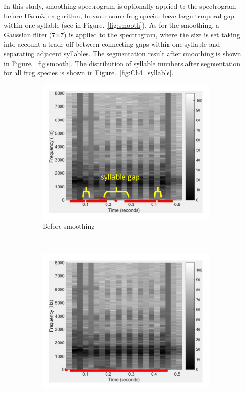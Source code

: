 In this study, smoothing spectrogram is optionally applied to the spectrogram before H$\ddot{a}$rm$\ddot{a}$'s algorithm, because some frog species have large temporal gap within one syllable (see in Figure.~\ref{fig:smooth}). As for the smoothing, a Gaussian filter (7$\times$7) is applied to the spectrogram, where the size is set taking into account a trade-off between connecting gaps within one syllable and separating adjacent syllables. The segmentation result after smoothing is shown in Figure.~\ref{fig:smooth}. The distribution of syllable numbers after segmentation for all frog species is shown in Figure.~\ref{fig:Ch4_syllable}.

\begin{figure}[htb!]
\centering
        \begin{subfigure}[b]{0.6\linewidth}
                \includegraphics[width=\textwidth]{image/Ch4/no.pdf}
                \caption{Before smoothing}
        \end{subfigure}%
        \\ 
        \begin{subfigure}[b]{0.6\linewidth}
                \includegraphics[width=\textwidth]{image/Ch4/yes.pdf}

\end{subfigure}
\end{figure}
